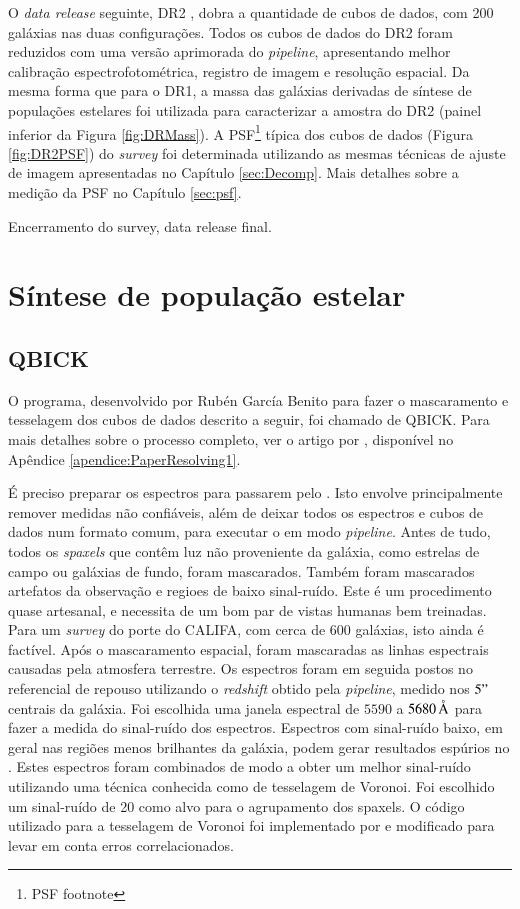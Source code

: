 O {\em data release} seguinte, DR2 \citep{GarciaBenito2015}, dobra a quantidade
de cubos de dados, com 200 galáxias nas duas configurações. Todos os cubos de
dados do DR2 foram reduzidos com uma versão aprimorada do {\em pipeline}\fixme,
apresentando melhor calibração espectrofotométrica\fixme, registro de imagem e
resolução espacial. Da mesma forma que para o DR1, a massa das galáxias
derivadas de síntese de populações estelares foi utilizada para caracterizar a
amostra do DR2 (painel inferior da Figura \ref{fig:DRMass}). A
PSF\footnote{\TODO PSF footnote} típica dos cubos de dados (Figura
\ref{fig:DR2PSF}) do {\em survey} foi determinada utilizando as mesmas técnicas
de ajuste de imagem apresentadas no Capítulo \ref{sec:Decomp}. Mais detalhes
sobre a medição da PSF no Capítulo \ref{sec:psf}.

\TODO Encerramento do survey, data release final.

\section{Síntese de população estelar}

\subsection{QBICK}

O programa, desenvolvido por Rubén García Benito para fazer o mascaramento e
tesselagem dos cubos de dados descrito a seguir, foi chamado de QBICK. Para mais
detalhes sobre o processo completo, ver o artigo por \citet{CidFernandes2013a},
disponível no Apêndice \ref{apendice:PaperResolving1}.

É preciso preparar os espectros para passarem pelo \starlight. Isto envolve
principalmente remover medidas não confiáveis, além de deixar todos os espectros
e cubos de dados num formato comum, para executar o \starlight em modo {\em
pipeline}. Antes de tudo, todos os {\em spaxels} que contêm luz não proveniente
da galáxia, como estrelas de campo ou galáxias de fundo, foram mascarados.
Também foram mascarados artefatos da observação e regioes de baixo sinal-ruído.
Este é um procedimento quase artesanal, e necessita de um bom par de vistas
humanas bem treinadas. Para um {\em survey} do porte do CALIFA, com cerca de 600
galáxias, isto ainda é factível. Após o mascaramento espacial, foram mascaradas
as linhas espectrais causadas pela atmosfera terrestre. Os espectros foram em
seguida postos no referencial de repouso utilizando o {\em redshift} obtido pela
{\em pipeline}, medido nos $5"$ centrais da galáxia. Foi escolhida uma janela
espectral de $5590$ a $5680\,\text{\normalfont\AA}$ para fazer a medida do sinal-ruído dos
espectros. Espectros com sinal-ruído baixo, em geral nas regiões menos
brilhantes da galáxia, podem gerar resultados espúrios no \starlight. Estes
espectros foram combinados de modo a obter um melhor sinal-ruído utilizando uma
técnica conhecida como de tesselagem de Voronoi. Foi escolhido um sinal-ruído de
20 como alvo para o agrupamento dos spaxels. O código utilizado para a
tesselagem de Voronoi foi implementado por \citet{Cappellari2003} e modificado
para levar em conta erros correlacionados.

